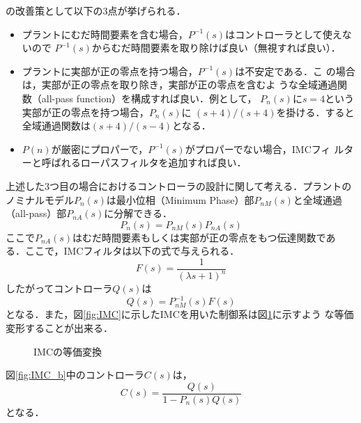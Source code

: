 \documentclass[a4paper,12pt]{jarticle}
\begin{document}
の改善策として以下の3点が挙げられる．
%
\begin{itemize}
 \item プラントにむだ時間要素を含む場合，$P^{-1}(s)$はコントローラとして使えないので
	   $P^{-1}(s)$からむだ時間要素を取り除けば良い（無視すれば良い）．
	   
 \item プラントに実部が正の零点を持つ場合，$P^{-1}(s)$は不安定である．こ
	   の場合は，実部が正の零点を取り除き，実部が正の零点を含むよ
	   うな全域通過関数（all-pass function）を構成すれば良い．例として，
	   $P_n(s)$に$s=4$という実部が正の零点を持つ場合，$P_n(s)$に
	   $(s+4)/(s+4)$を掛ける．すると全域通過関数は$(s+4)/(s-4)$となる．
	   
 \item $P(n)$が厳密にプロパーで，$P^{-1}(s)$がプロパーでない場合，IMCフィ
	   ルターと呼ばれるローパスフィルタを追加すれば良い．
\end{itemize}
%
上述した3つ目の場合におけるコントローラの設計に関して考える．プラントの
ノミナルモデル$P_n(s)$は最小位相（Minimum Phase）部$P_{nM}(s)$と全域通過
（all-pass）部$P_{nA}(s)$に分解できる．
%
\begin{equation}
 P_n(s)=P_{nM}(s)P_{nA}(s)
\end{equation}
%
ここで$P_{nA}(s)$はむだ時間要素もしくは実部が正の零点をもつ伝達関数であ
る．ここで，IMCフィルタは以下の式で与えられる．
%
\begin{equation}\label{equ:imc_f}
 F(s) = \frac{1}{(\lambda s + 1)^n}
\end{equation}
%
したがってコントローラ$Q(s)$は
%
\begin{equation}\label{equ:imc_c}
 Q(s) = P_{nM}^{-1}(s)F(s)
\end{equation}
%
となる．また，図\ref{fig:IMC}に示したIMCを用いた制御系は図\ref{fig:henkan}に示すよう
な等価変形することが出来る．
%
\begin{figure}[tbp]
  \begin{center} 
  \hfill
  \end{center}
  \caption{IMCの等価変換}
  \label{fig:henkan}
\end{figure}
%
図\ref{fig:IMC_b}中のコントローラ$C(s)$は，
%
\begin{equation}
 C(s) = \frac{Q(s)}{1 - P_n(s)Q(s)}
\end{equation}
%
となる．
\end{document}
